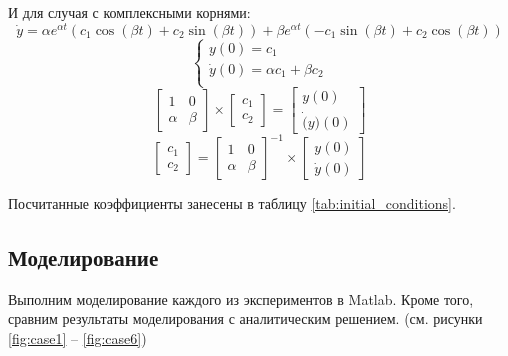 И для случая с комплексными корнями:
\begin{equation}
    \dot{y} = \alpha e^{\alpha t} \left( c_1 \cos(\beta t) + c_2 \sin(\beta t) \right) + \beta e^{\alpha t} \left(-c_1 \sin(\beta t) + c_2 \cos(\beta t) \right)
\end{equation}
\begin{equation}
    \begin{cases}
        y(0) = c_1  \\
        \dot{y}(0) = \alpha c_1 + \beta c_2 \\
    \end{cases}
\end{equation}
\begin{equation}
    \begin{bmatrix}
        1 & 0 \\
        \alpha & \beta
    \end{bmatrix} \times
    \begin{bmatrix}
        c_1 \\
        c_2
    \end{bmatrix} =
    \begin{bmatrix}
        y(0) \\
        \dot(y)(0)
    \end{bmatrix}
\end{equation}
\begin{equation}
    \begin{bmatrix}
        c_1 \\
        c_2
    \end{bmatrix} = 
    \begin{bmatrix}
        1 & 0 \\
        \alpha & \beta
    \end{bmatrix}^{-1} \times
    \begin{bmatrix}
        y(0) \\
        \dot{y}(0)
    \end{bmatrix}
\end{equation}

Посчитанные коэффициенты занесены в таблицу \ref{tab:initial_conditions}.

\subsection{Моделирование}
Выполним моделирование каждого из экспериментов в Matlab. Кроме того, сравним 
результаты моделирования с аналитическим решением. (см. рисунки \ref{fig:case1} -- \ref{fig:case6})

